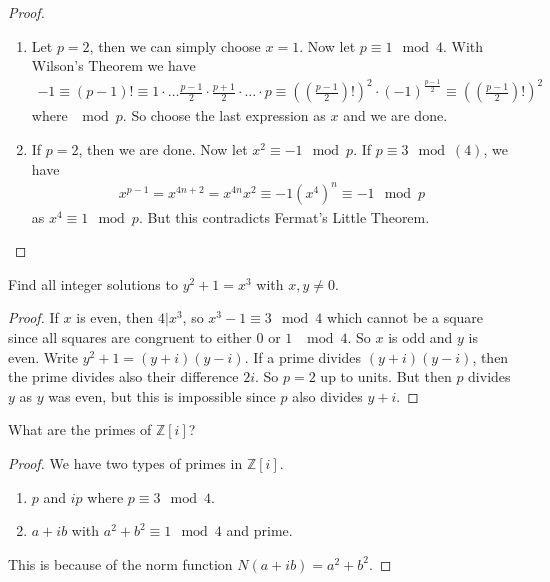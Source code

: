 \begin{proof}
    \begin{enumerate}
        \item Let \(p = 2\), then we can simply choose \(x = 1\). Now let \(p \equiv 1 \mod{4}\). With Wilson's Theorem we have
        \begin{align*}
            -1 \equiv (p - 1)! \equiv 1 \cdot \ldots \frac{p - 1}{2} \cdot \frac{p + 1}{2} \cdot \ldots \cdot p \equiv \left(\left(\frac{p - 1}{2}\right)!\right)^2 \cdot (-1)^{\frac{p - 1}{2}} \equiv \left(\left(\frac{p - 1}{2}\right)!\right)^2
        \end{align*}
        where \(\mod{p}\). So choose the last expression as \(x\) and we are done.
        \item If \(p = 2\), then we are done. Now let \(x^2 \equiv -1 \mod{p}\). If \(p \equiv 3 \mod(4)\), we have
        \begin{align*}
            x^{p - 1} = x^{4n + 2} = x^{4n} x^2 \equiv -1 (x^4)^n \equiv -1 \mod{p}
        \end{align*}
        as \(x^4 \equiv 1 \mod{p}\). But this contradicts Fermat's Little Theorem.
    \end{enumerate}
\end{proof}
\begin{example}
    Find all integer solutions to \(y^2 + 1 = x^3\) with \(x, y \neq 0\).
\end{example}
\begin{proof}
    If \(x\) is even, then \(4 | x^3\), so \(x^3 - 1 \equiv 3 \mod 4\) which cannot be a square since all squares are congruent to either \(0\) or \(1\) \(\mod{4}\). So \(x\) is odd and \(y\) is even. Write \(y^2 + 1 = (y + i)(y - i)\). If a prime divides \((y + i)(y - i)\), then the prime divides also their difference \(2i\). So \(p = 2\) up to units. But then \(p\) divides \(y\) as \(y\) was even, but this is impossible since \(p\) also divides \(y + i\).
\end{proof}

\begin{example}
    What are the primes of \(\mathbb{Z}[i]\)?
\end{example}
\begin{proof}
    We have two types of primes in \(\mathbb{Z}[i]\).
    \begin{enumerate}
        \item \(p\) and \(ip\) where \(p \equiv 3 \mod{4}\).
        \item \(a + i b\) with \(a^2 + b^2 \equiv 1 \mod{4}\) and prime.
    \end{enumerate}
    This is because of the norm function \(N(a + ib) = a^2 + b^2\).
\end{proof}

